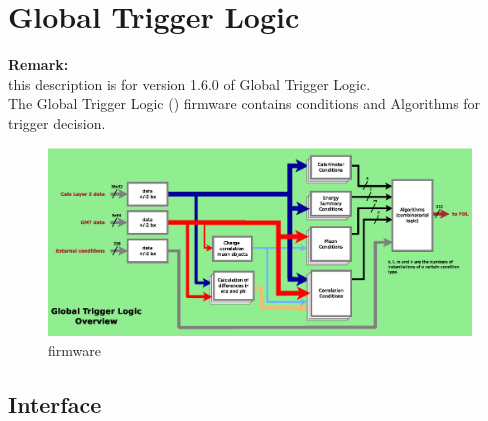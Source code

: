 
\section{Global Trigger Logic}
\label{sec:gtl:global_trigger_logic}
\textbf{Remark:}\\
this description is for version 1.6.0 of Global Trigger Logic.\\

The Global Trigger Logic (\ugtl) firmware contains conditions and Algorithms for trigger decision.

\begin{figure}[htb]
\centering
\includegraphics[width=15cm]{figures/mGTL_firmware}
\caption{\ugtl firmware} 
\label{fig:gtl:mGTL_firmware}
\end{figure}

\subsection{\ugtl Interface}
\label{sec:gtl:ugtl_interface}

